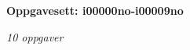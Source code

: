 \centerline{\bf Oppgavesett: i00000no-i00009no}
\vskip 10pt
\centerline{\it 10 oppgaver}\vskip 10pt
\vskip 10pt

